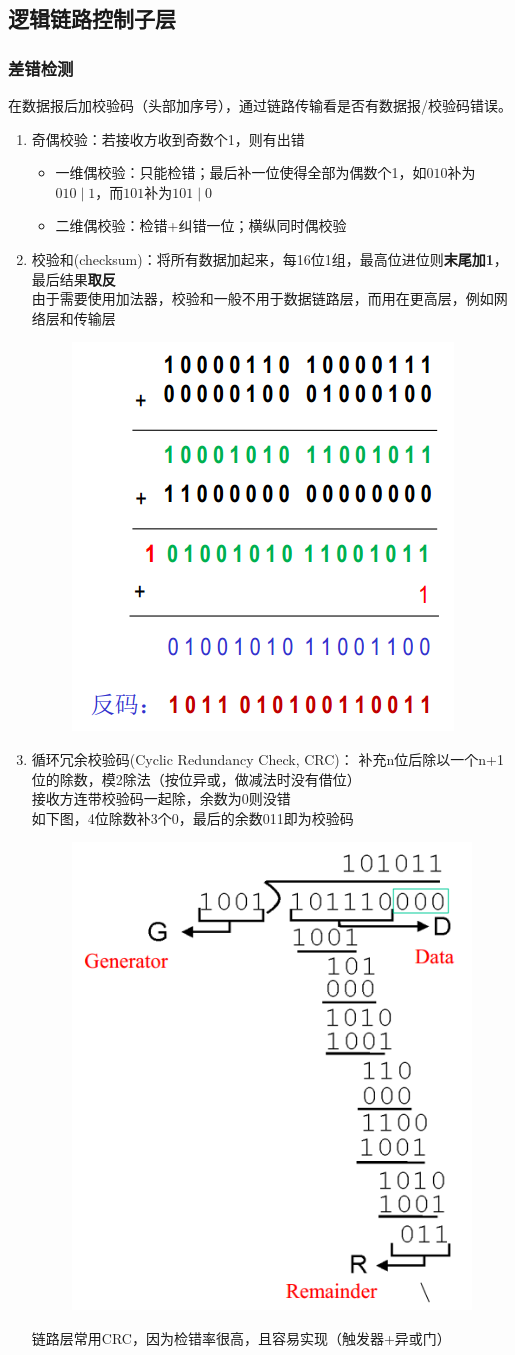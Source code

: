 \subsection{逻辑链路控制子层}
\subsubsection{差错检测}
在数据报后加校验码（头部加序号），通过链路传输看是否有数据报/校验码错误。
\begin{enumerate}
\item 奇偶校验：若接收方收到奇数个1，则有出错
\begin{itemize}
	\item 一维偶校验：只能检错；最后补一位使得全部为偶数个1，如$010$补为$010\mid 1$，而$101$补为$101\mid 0$
	\item 二维偶校验：检错+纠错一位；横纵同时偶校验
\end{itemize}
\item 校验和(checksum)：将所有数据加起来，每16位1组，最高位进位则\textbf{末尾加1}，最后结果\textbf{取反}\\
由于需要使用加法器，校验和一般不用于数据链路层，而用在更高层，例如网络层和传输层
\begin{figure}[H]
	\centering
	\includegraphics[width=0.4\linewidth]{fig/checksum.PNG}
\end{figure}
\item 循环冗余校验码(Cyclic Redundancy Check, CRC)：
补充n位后除以一个n+1位的除数，模2除法（按位异或，做减法时没有借位）\\
接收方连带校验码一起除，余数为0则没错\\
如下图，4位除数补3个0，最后的余数011即为校验码
\begin{figure}[H]
	\centering
	\includegraphics[width=0.4\linewidth]{fig/CRC.PNG}
\end{figure}
链路层常用CRC，因为检错率很高，且容易实现（触发器+异或门）
\end{enumerate}

